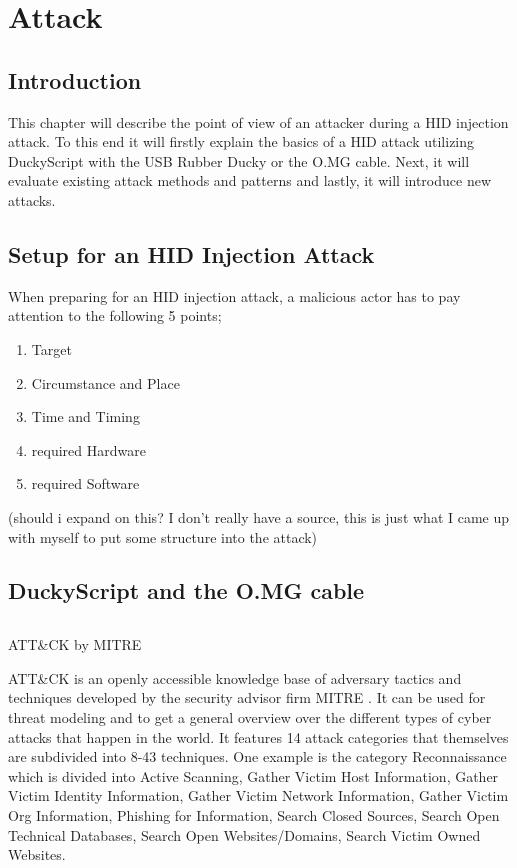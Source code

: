 \chapter{Attack}

\section{Introduction}

This chapter will describe the point of view of an attacker during a HID injection attack. To this end it will firstly explain the basics of a HID attack utilizing DuckyScript with the USB Rubber Ducky or the O.MG cable. Next, it will evaluate existing attack methods and patterns and lastly, it will introduce new attacks. 

\section{Setup for an HID Injection Attack}

When preparing for an HID injection attack, a malicious actor has to pay attention to the following 5 points;
\begin{enumerate}
    \item Target
    \item Circumstance and Place
    \item Time and Timing
    \item required Hardware
    \item required Software
\end{enumerate}

(should i expand on this? I don't really have a source, this is just what I came up with myself to put some structure into the attack)

\section{DuckyScript and the O.MG cable}

\section{}{ATT\&CK by MITRE}

ATT\&CK \cite{MITREATTCK} is an openly accessible knowledge base of adversary tactics and techniques developed by the security advisor firm MITRE \cite{WhoWeAre}. It can be used for threat modeling and to get a general overview over the different types of cyber attacks that happen in the world.
It features 14 attack categories that themselves are subdivided into 8-43 techniques. One example is the category Reconnaissance which is divided into Active Scanning, Gather Victim Host Information, Gather Victim Identity Information, Gather Victim Network Information, Gather Victim Org Information, Phishing for Information, Search Closed Sources, Search Open Technical Databases, Search Open Websites/Domains, Search Victim Owned Websites. 



